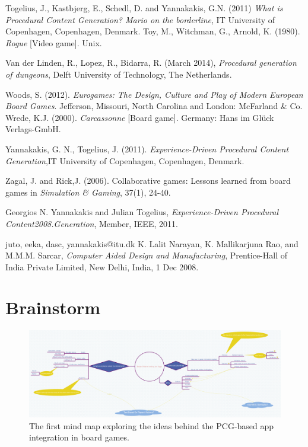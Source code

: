 \documentclass[a4paper,11pt]{article}
\begin{document}
\begin{thebibliography}{1}
Togelius, J., Kastbjerg, E., Schedl, D. and Yannakakis, G.N. (2011) \emph{What is Procedural Content Generation? Mario on the borderline}, IT University of Copenhagen, Copenhagen, Denmark.
Toy, M., Witchman, G., Arnold, K. (1980). \textit{Rogue} [Video game]. Unix.

Van der Linden, R., Lopez, R., Bidarra, R. (March 2014), \textit{Procedural generation of dungeons}, Delft University of Technology, The Netherlands.

Woods, S. (2012). \textit{Eurogames: The Design, Culture and Play of Modern European Board Games}. Jefferson, Missouri, North Carolina and London: McFarland \& Co.
Wrede, K.J. (2000). \textit{Carcassonne} [Board game]. Germany: Hans im Glück Verlags-GmbH.

Yannakakis, G. N., Togelius, J. (2011). \textit{Experience-Driven Procedural Content Generation},IT University of Copenhagen, Copenhagen, Denmark.

Zagal, J. and Rick,J. (2006). Collaborative games: Lessons learned from board games in \textit{Simulation \& Gaming}, 37(1), 24-40.

Georgios N. Yannakakis and Julian Togelius, \emph{Experience-Driven Procedural Content2008.Generation}, Member, IEEE, 2011.

{juto, eeka, dasc, yannakakis}@itu.dk
K. Lalit Narayan, K. Mallikarjuna Rao, and M.M.M. Sarcar, \emph{Computer Aided Design and Manufacturing}, Prentice-Hall of India Private Limited, New Delhi, India, 1 Dec 2008.

\end{thebibliography}
\pagebreak
\appendix
\section{Brainstorm}
\begin{figure}[h]
    \centering
    \includegraphics[scale=0.2,angle=-90]{Images/Brainstorm1.png}
    \caption{The first mind map exploring the ideas behind the PCG-based app integration in board games.}
    \label{fig:brainstorm1}
\end{figure}
\end{document}
